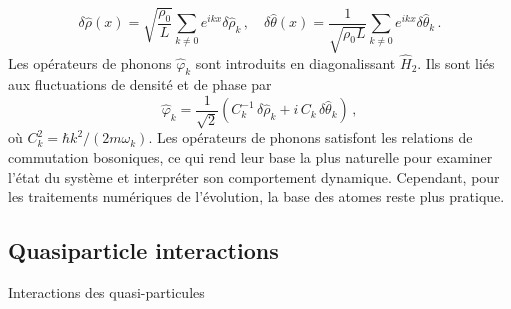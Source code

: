 \documentclass[aps,prd,notitlepage,amsfonts,amssymb,amsmath,nofootinbib,superscriptaddress,longbibliography]{revtex4-2}
\newcommand{\trad}[1]{\textcolor{tradcolor}{#1}}
\begin{document}
{\begin{equation*}
		\delta\hat{\rho}(x) = \sqrt{\frac{\rho_{0}}{L}} \sum_{k \neq 0} e^{i k x} \delta\hat{\rho}_{k} \,, \quad \delta\hat{\theta}(x) = \frac{1}{\sqrt{\rho_{0} L}} \sum_{k \neq 0} e^{i k x} \delta\hat{\theta}_{k} \,.
\end{equation*}
Les opérateurs de phonons $\hat{\varphi}_{k}$ sont introduits en diagonalissant $\hat{H}_{2}$. Ils sont liés aux fluctuations de densité et de phase par
\begin{equation*}
	\hat{\varphi}_{k} = \frac{1}{\sqrt{2}} \left( C_{k}^{-1} \, \delta\hat{\rho}_{k} + i \, C_{k} \, \delta\hat{\theta}_{k} \right) \,,
\end{equation*}
où $C_{k}^{2} = \hbar k^{2}/\left(2m \omega_{k}\right)$. Les opérateurs de phonons satisfont les relations de commutation bosoniques, ce qui rend leur base la plus naturelle pour examiner l'état du système et interpréter son comportement dynamique. Cependant, pour les traitements numériques de l'évolution, la base des atomes reste plus pratique.
}

\subsection{Quasiparticle interactions}
\trad{Interactions des quasi-particules}
\end{document}

